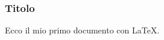 \documentclass[a4paper]{article}
\begin{document}
\subsubsection*{Titolo} 
Ecco il mio primo documento con \LaTeX.
\end{document}
